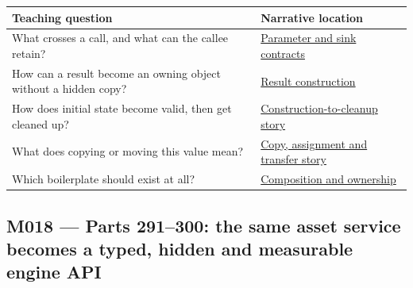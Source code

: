 {\def\LTcaptype{none} %
\begin{longtable}[]{@{}
  >{\raggedright\arraybackslash}p{}
  >{\raggedright\arraybackslash}p{}@{}}
\toprule\noalign{}
\begin{minipage}[b]{\linewidth}\raggedright
Teaching question
\end{minipage} & \begin{minipage}[b]{\linewidth}\raggedright
Narrative location
\end{minipage} \\
\midrule\noalign{}
\endhead
\bottomrule\noalign{}
\endlastfoot
What crosses a call, and what can the callee retain? & \href{Continuous\%20Notes/Computing\%20Foundations\%20-\%20From\%20Bits\%20to\%20C++\%20and\%20Systems\%20APIs\#A\%20value\%20crosses\%20the\%20function\%20boundary/}{Parameter and sink contracts} \\
How can a result become an owning object without a hidden copy? & \href{Continuous\%20Notes/Computing\%20Foundations\%20-\%20From\%20Bits\%20to\%20C++\%20and\%20Systems\%20APIs\#Return\%20a\%20result\%20without\%20handing\%20out\%20a\%20lifetime\%20problem/}{Result construction} \\
How does initial state become valid, then get cleaned up? & \href{Continuous\%20Notes/Computing\%20Foundations\%20-\%20From\%20Bits\%20to\%20C++\%20and\%20Systems\%20APIs\#Construction\%20establishes\%20a\%20usable\%20state/}{Construction-to-cleanup story} \\
What does copying or moving this value mean? & \href{Continuous\%20Notes/Computing\%20Foundations\%20-\%20From\%20Bits\%20to\%20C++\%20and\%20Systems\%20APIs\#Copy\%20a\%20meaning\%20rather\%20than\%20just\%20its\%20bytes/}{Copy, assignment and transfer story} \\
Which boilerplate should exist at all? & \href{Continuous\%20Notes/Computing\%20Foundations\%20-\%20From\%20Bits\%20to\%20C++\%20and\%20Systems\%20APIs\#From\%20three\%20repairs\%20to\%20five\%20decisions\%20to\%20zero\%20boilerplate/}{Composition and ownership} \\
\end{longtable}
}

\subsection{M018 --- Parts 291--300: the same asset service becomes a typed, hidden and measurable engine API}\label{m018-parts-291300-the-same-asset-service-becomes-a-typed-hidden-and-measurable-engine-api}

